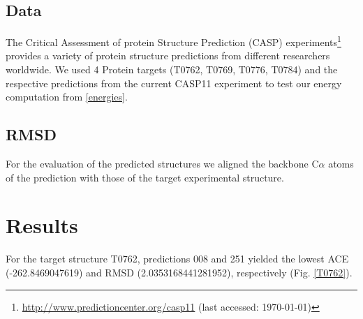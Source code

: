 \documentclass[11pt,a4paper]{article}
\newcommand{\fnurl}[2]{\footnote{\url{#1} (last accessed: #2)}} %
\renewcommand{\(}{\left (}
\renewcommand{\)}{\right )}
\begin{document}
\subsection{Data}
The Critical Assessment of protein Structure Prediction (CASP) experiments\fnurl{http://www.predictioncenter.org/casp11}{\today} provides a variety of protein structure predictions from different researchers worldwide. We used 4 Protein targets (T0762, T0769, T0776, T0784) and the respective predictions from the current CASP11 experiment to test our energy computation from \ref{energies}.
\subsection{RMSD}
For the evaluation of the predicted structures we aligned the backbone C$\alpha$ atoms of the prediction with those of the target experimental structure. 


\section{Results}
For the target structure T0762, predictions 008 and 251 yielded the lowest ACE (-262.8469047619) and RMSD (2.0353168441281952), respectively (Fig. \ref{T0762}).
\end{document}
